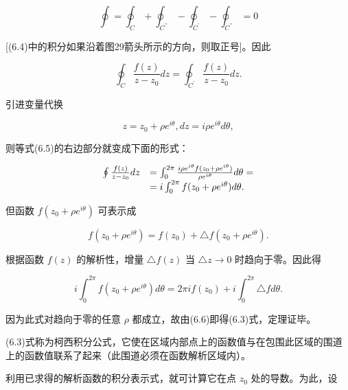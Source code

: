 \begin{equation*}
\oint = \oint_ {C} + \oint_ {C ^ {\prime \prime}} - \oint_ {C ^ {\prime}} - \oint_ {C ^ {\prime \prime}} = 0\tag{6.4}
\end{equation*}

[(6.4)中的积分如果沿着图29箭头所示的方向，则取正号]。因此

\begin{equation*}
\oint_ {C} \frac {f (z)}{z - z _ {0}} d z = \oint_ {C ^ {\prime}} \frac {f (z)}{z - z _ {0}} d z.\tag{6.5}
\end{equation*}

引进变量代换

\begin{equation*}
z = z _ {0} + \rho e ^ {i \theta}, d z = i \rho e ^ {i \theta} d \theta,
\end{equation*}

则等式(6.5)的右边部分就变成下面的形式：

\begin{equation*}
\begin{array}{r l} \oint \frac {f (z)}{z - z _ {0}} d z & = \int_ {0} ^ {2 \pi} \frac {i \rho e ^ {i \theta} f (z _ {0} + \rho e ^ {i \theta})}{\rho e ^ {i \theta}} d \theta = \\ & = i \int_ {0} ^ {2 \pi} f (z _ {0} + \rho e ^ {i \theta}) d \theta . \end{array}
\end{equation*}

但函数 $f(z_0 + \rho e^{i\theta})$ 可表示成

\begin{equation*}
f (z _ {0} + \rho e ^ {i \theta}) = f (z _ {0}) + \triangle f (z _ {0} + \rho e ^ {i \theta}).
\end{equation*}

根据函数 $f(z)$ 的解析性，增量 $\triangle f(z)$ 当 $\triangle z \to 0$ 时趋向于零。因此得

\begin{equation*}
i \int_ {0} ^ {2 \pi} f (z _ {0} + \rho e ^ {i \theta}) d \theta = 2 \pi i f (z _ {0}) + i \int_ {0} ^ {2 \pi} \triangle f d \theta .\tag{6.6}
\end{equation*}

因为此式对趋向于零的任意 $\rho$ 都成立，故由(6.6)即得(6.3)式，定理证毕。

(6.3)式称为柯西积分公式，它使在区域内部点上的函数值与在包围此区域的围道上的函数值联系了起来（此围道必须在函数解析区域内）。

利用已求得的解析函数的积分表示式，就可计算它在点 $z_{0}$ 处的导数。为此，设

